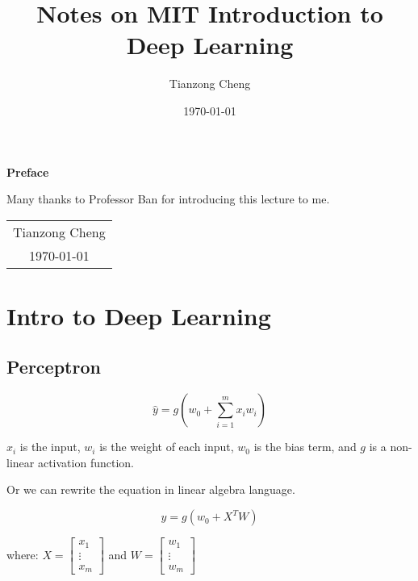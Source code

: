 \documentclass[12pt, a4paper, oneside]{article}
\title{{\Huge{\textbf{Notes on MIT Introduction to Deep Learning}}}}
\author{Tianzong Cheng}
\date{\today}
\begin{document}
\maketitle
\thispagestyle{empty}

\newpage
\thispagestyle{empty}
\begin{center}
    \Huge\textbf{Preface}
\end{center}
Many thanks to Professor Ban for introducing this lecture to me.
\begin{flushright}
    \begin{tabular}{c}
        Tianzong Cheng \\
        \today
    \end{tabular}
\end{flushright}

\newpage
{}
\setcounter{page}{1}
\tableofcontents

\newpage
\setcounter{page}{1}

\section{Intro to Deep Learning}

\subsection{Perceptron}

\begin{equation*}
    \hat{y}=g(w_{0}+\sum_{i=1}^{m}x_{i}w_{i})
\end{equation*}

$x_{i}$ is the input, $w_{i}$ is the weight of each input, $w_{0}$ is the bias term, and $g$ is a non-linear activation function.

Or we can rewrite the equation in linear algebra language.

\begin{equation*}
    \hat{y} = g(w_{0}+X^{T}W)
\end{equation*}

where: $X=\begin{bmatrix}
        x_{1}  \\
        \vdots \\
        x_{m}
    \end{bmatrix}$ and $W=\begin{bmatrix}
        w_{1}  \\
        \vdots \\
        w_{m}
    \end{bmatrix}$
\end{document}
